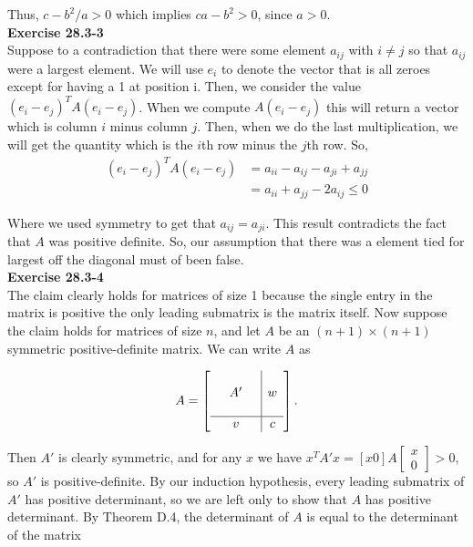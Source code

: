 \documentclass{article}
\begin{document}
Thus, $c-b^2/a > 0$ which implies $ca - b^2 > 0$, since $a>0$.  \\

\noindent\textbf{Exercise 28.3-3}\\

Suppose to a contradiction that there were some element $a_{ij}$ with $i\neq j$ so that $a_{ij}$ were a largest element. We will use $e_i$ to denote the vector that is all zeroes except for having a 1 at position i. Then, we consider the value $(e_i-e_j)^T A (e_i-e_j)$. When we compute $A(e_i-e_j)$ this will return a vector which is column $i$ minus column $j$. Then, when we do the last multiplication, we will get the quantity which is the $i$th row minus the $j$th row. So, 
\begin{align*}
(e_i-e_j)^T A (e_i-e_j) &= a_{ii} - a_{ij} - a_{ji}  +a_{jj}\\
&=a_{ii} + a_{jj} - 2 a_{ij}\le0
\end{align*}

Where we used symmetry to get that $a_{ij} =a_{ji}$. This result contradicts the fact that $A$ was positive definite. So, our assumption that there was a element tied for largest off the diagonal must of been false.\\

\noindent\textbf{Exercise 28.3-4}\\

The claim clearly holds for matrices of size 1 because the single entry in the matrix is positive the only leading submatrix is the matrix itself.  Now suppose the claim holds for matrices of size $n$, and let $A$ be an $(n+1) \times (n+1)$ symmetric positive-definite matrix. We can write $A$ as 

\[A = \left[ \begin{array}{ccc|c} & & & \\  & A' & & w \\ & & & \\ \hline & v & & c\end{array} \right]. \]

Then $A'$ is clearly symmetric, and for any $x$ we have $x^T A' x = [x 0] A \left[ \begin{array}{c} x \\ 0 \end{array} \right] > 0$, so $A'$ is positive-definite.  By our induction hypothesis, every leading submatrix of $A'$ has positive determinant, so we are left only to show that $A$ has positive determinant.  By Theorem D.4, the determinant of $A$ is equal to the determinant of the matrix 
\end{document}
